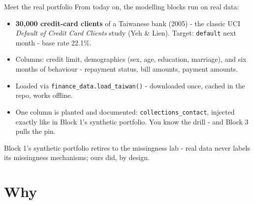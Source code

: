 \documentclass[10pt,aspectratio=169]{beamer}
\begin{document}
\begin{frame}{Meet the real portfolio}
  From today on, the modelling blocks run on \alert{real data}:
  \vspace{0.3em}
  \begin{itemize}\small
    \item \textbf{30{,}000 credit-card clients} of a Taiwanese bank (2005)
          - the classic UCI \emph{Default of Credit Card Clients} study
          (Yeh \& Lien). Target: \texttt{default} next month -
          base rate \alert{22.1\%}.
    \item Columns: credit limit, demographics (sex, age, education,
          marriage), and \alert{six months of behaviour} - repayment
          status, bill amounts, payment amounts.
    \item Loaded via \texttt{finance\_data.load\_taiwan()} - downloaded
          once, cached in the repo, works offline.
    \item One column is \alert{planted and documented}:
          \texttt{collections\_contact}, injected exactly like in Block 1's
          synthetic portfolio. You know the drill - and Block 3 pulls the
          pin.
  \end{itemize}
  \vspace{0.3em}
  \begin{center}\small
    Block 1's synthetic portfolio retires to the missingness lab - real
    data never labels its missingness mechanisms; ours did, by design.
  \end{center}
\end{frame}

\section{Why}
\end{document}
